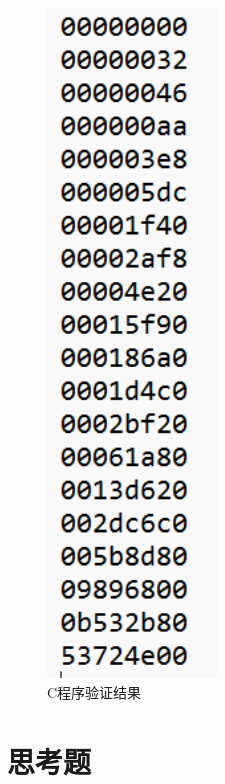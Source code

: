 \documentclass{article}
\begin{document}
    \begin{figure}[H]
        \centering
        \includegraphics[width=0.4\textwidth]{5.5.3.png}
    \caption{C程序验证结果}
    \end{figure}

    \section{思考题}
\end{document}
